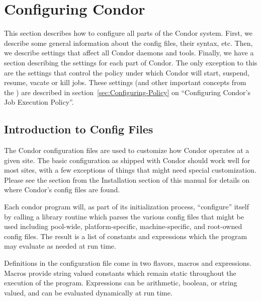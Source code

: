 \section{\label{sec:Configuring-Condor}
Configuring Condor}

This section describes how to configure all parts of the Condor
system.  First, we describe some general information about the config
files, their syntax, etc.  Then, we describe settings that affect all
Condor daemons and tools.  Finally, we have a section describing the
settings for each part of Condor.  The only exception to this are the
settings that control the policy under which Condor will start,
suspend, resume, vacate or kill jobs.  These settings (and other
important concepts from the ) are described in 
section~\ref{sec:Configuring-Policy} on ``Configuring Condor's Job
Execution Policy''. 

\subsection{\label{sec:Intro-to-Config-Files}
Introduction to Config Files}

The Condor configuration files are used to customize how Condor
operates at a given site.  The basic configuration as shipped with
Condor should work well for most sites, with a few exceptions of
things that might need special customization.  Please see the section
from the Installation section of this manual for details on where
Condor's config files are found.

Each condor program will, as part of its initialization process,
``configure'' itself by calling a library routine which parses the
various config files that might be used including pool-wide,
platform-specific, machine-specific, and root-owned config files.  The
result is a list of constants and expressions which the program may
evaluate as needed at run time.

Definitions in the configuration file come in two flavors, macros and
expressions.  Macros provide string valued constants which remain
static throughout the execution of the program.  Expressions can be
arithmetic, boolean, or string valued, and can be evaluated
dynamically at run time.

